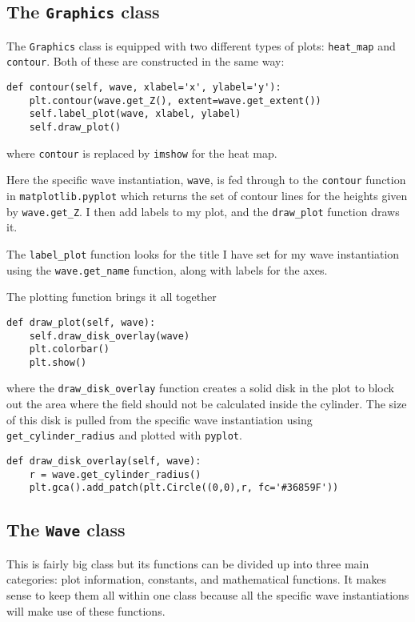 \subsection{The \texttt{Graphics} class}
%
The \verb!Graphics! class is equipped with two different types of plots: \verb!heat_map! and \verb!contour!. Both of these are constructed in the same way:
%
  \begin{lstlisting}[caption={},label={lst:contour}]
def contour(self, wave, xlabel='x', ylabel='y'):
    plt.contour(wave.get_Z(), extent=wave.get_extent())
    self.label_plot(wave, xlabel, ylabel)
    self.draw_plot() \end{lstlisting}
%
where \verb!contour! is replaced by \verb!imshow! for the heat map. \par
%
Here the specific wave instantiation, \verb!wave!, is fed through to the \verb!contour! function in \verb!matplotlib.pyplot! which returns the set of contour lines for the heights given by \verb!wave.get_Z!. I then add labels to my plot, and the \verb!draw_plot! function draws it. \par
%
The \verb!label_plot! function looks for the title I have set for my wave instantiation using the \verb!wave.get_name! function, along with labels for the axes. \par
%
The plotting function brings it all together
%
  \begin{lstlisting}
def draw_plot(self, wave):
    self.draw_disk_overlay(wave)
    plt.colorbar()
    plt.show()\end{lstlisting}
%
where the \verb!draw_disk_overlay! function creates a solid disk in the plot to block out the area where the field should not be calculated inside the cylinder. The size of this disk is pulled from the specific wave instantiation using \verb!get_cylinder_radius! and plotted with \verb!pyplot!.
%
\begin{lstlisting}
def draw_disk_overlay(self, wave):
    r = wave.get_cylinder_radius()
    plt.gca().add_patch(plt.Circle((0,0),r, fc='#36859F'))
\end{lstlisting}
%
\subsection{The \texttt{Wave} class}
%
This is fairly big class but its functions can be divided up into three main categories: plot information, constants, and mathematical functions. It makes sense to keep them all within one class because all the specific wave instantiations will make use of these functions. \par
%
